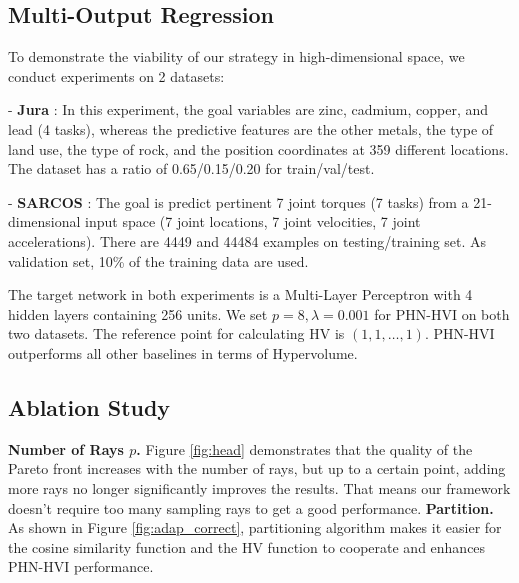 \documentclass[letterpaper]{article} %
\newcommand{\ourmodel}{PHN-HVI }
\begin{document}
\subsection{Multi-Output Regression}
To demonstrate the viability of our strategy in high-dimensional space, we conduct experiments on 2 datasets:

\indent - \textbf{Jura} \cite{Goovaerts1997}: In this experiment, the goal variables are zinc, cadmium, copper, and lead (4 tasks), whereas the predictive features are the other metals, the type of land use, the type of rock, and the position coordinates at 359 different locations. The dataset has a ratio of 0.65/0.15/0.20 for train/val/test.

\indent - \textbf{SARCOS} \cite{Sethu2000}:  The goal is predict pertinent 7 joint torques (7 tasks) from a 21-dimensional input space (7 joint locations, 7 joint velocities, 7 joint accelerations). There are 4449 and 44484 examples on testing/training set. As validation set, 10\% of the training data are used.

The target network in both experiments is a Multi-Layer Perceptron with 4 hidden layers containing 256 units. We set $p=8, \lambda=0.001$ for \ourmodel on both two datasets. The reference point for calculating HV is $(1, 1, \dots, 1)$. \ourmodel outperforms all other baselines in terms of Hypervolume.

\subsection{Ablation Study}
\textbf{Number of Rays $p$.} Figure \ref{fig:head} demonstrates that the quality of the Pareto front increases with the number of rays, but up to a certain point, adding more rays no longer significantly improves the results. That means our framework doesn't require too many sampling rays to get a good performance.
\indent \textbf{Partition.} As shown in Figure \ref{fig:adap_correct}, partitioning algorithm makes it easier for the cosine similarity function and the HV function to cooperate and enhances \ourmodel performance.
\end{document}
